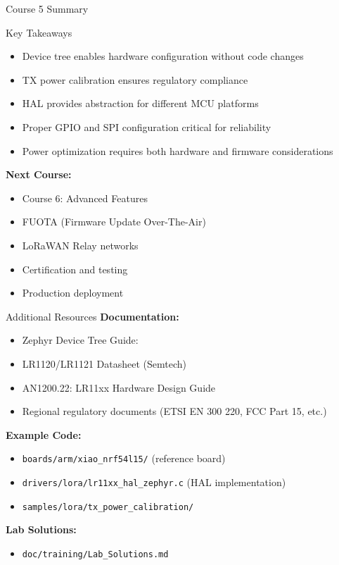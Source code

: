 \documentclass{beamer}
\begin{document}
\begin{frame}{Course 5 Summary}
\begin{block}{Key Takeaways}
\begin{itemize}
    \item Device tree enables hardware configuration without code changes
    \item TX power calibration ensures regulatory compliance
    \item HAL provides abstraction for different MCU platforms
    \item Proper GPIO and SPI configuration critical for reliability
    \item Power optimization requires both hardware and firmware considerations
\end{itemize}
\end{block}

\vspace{0.5cm}

\textbf{Next Course:}
\begin{itemize}
    \item Course 6: Advanced Features
    \item FUOTA (Firmware Update Over-The-Air)
    \item LoRaWAN Relay networks
    \item Certification and testing
    \item Production deployment
\end{itemize}
\end{frame}

\begin{frame}{Additional Resources}
\textbf{Documentation:}
\begin{itemize}
    \item Zephyr Device Tree Guide: 
    \item LR1120/LR1121 Datasheet (Semtech)
    \item AN1200.22: LR11xx Hardware Design Guide
    \item Regional regulatory documents (ETSI EN 300 220, FCC Part 15, etc.)
\end{itemize}

\vspace{0.3cm}

\textbf{Example Code:}
\begin{itemize}
    \item \texttt{boards/arm/xiao\_nrf54l15/} (reference board)
    \item \texttt{drivers/lora/lr11xx\_hal\_zephyr.c} (HAL implementation)
    \item \texttt{samples/lora/tx\_power\_calibration/}
\end{itemize}

\vspace{0.3cm}

\textbf{Lab Solutions:}
\begin{itemize}
    \item \texttt{doc/training/Lab\_Solutions.md}
\end{itemize}
\end{frame}
\end{document}
